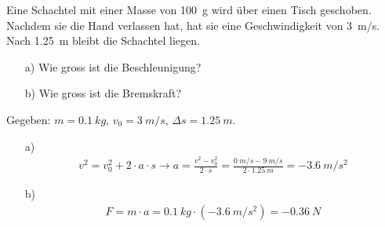 
\begin{aufgabe}
Eine Schachtel mit einer Masse von \SI{100}{g} wird über einen Tisch geschoben.
Nachdem sie die Hand verlassen hat, hat sie eine Geschwindigkeit von \SI{3}{m/s}.
Nach \SI{1.25}{m} bleibt die Schachtel liegen.
\begin{itemize}
\item[a)] Wie gross ist die Beschleunigung?
\item[b)] Wie gross ist die Bremskraft?
\end{itemize}
	
	\begin{loesung}
		Gegeben: $m=\SI{0.1}{kg}$, $v_0=\SI{3}{m/s}$, $\Delta s=\SI{1.25}{m}$. 
		\begin{itemize}
\item[a)] 
	\begin{eqnarray*}
		v^2=v_0^2 + 2\cdot a\cdot s \to a=\frac{v^2-v_0^2}{2\cdot s}=\frac{\SI{0}{m/s}-\SI{9}{m/s}}{2\cdot\SI{1.25}{m}}=\SI{-3.6}{m/s^2}
	\end{eqnarray*}
\item[b)]  
	\begin{eqnarray*}
		F=m\cdot a=\SI{0.1}{kg}\cdot(-\SI{3.6}{m/s^2})=\SI{-0.36}{N}
	\end{eqnarray*}
\end{itemize}
	\end{loesung}
\end{aufgabe}

